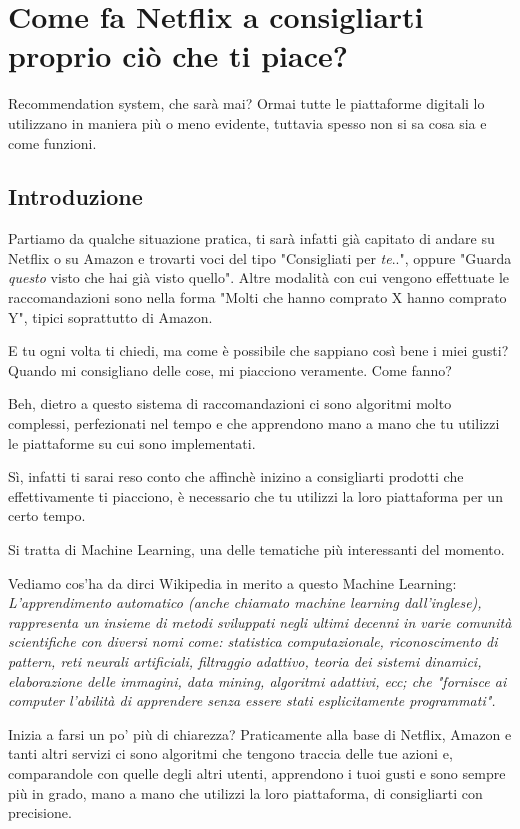 \chapter{Come fa Netflix a consigliarti proprio ciò che ti piace?}
Recommendation system, che sarà mai? Ormai tutte le piattaforme digitali lo utilizzano in maniera più o meno evidente, tuttavia spesso non si sa cosa sia e come funzioni.

\section{Introduzione}

Partiamo da qualche situazione pratica, ti sarà infatti già capitato di andare su Netflix o su Amazon e trovarti voci del tipo "Consigliati per \emph{te}..", oppure "Guarda \emph{questo} visto che hai già visto quello". Altre modalità con cui vengono effettuate le raccomandazioni sono nella forma "Molti che hanno comprato X hanno comprato Y", tipici soprattutto di Amazon.

E tu ogni volta ti chiedi, ma come è possibile che sappiano così bene i miei gusti? Quando mi consigliano delle cose, mi piacciono veramente. Come fanno? 

Beh, dietro a questo sistema di raccomandazioni ci sono algoritmi molto complessi, perfezionati nel tempo e che apprendono mano a mano che tu utilizzi le piattaforme su cui sono implementati.

Sì, infatti ti sarai reso conto che affinchè inizino a consigliarti prodotti che effettivamente ti piacciono, è necessario che tu utilizzi la loro piattaforma per un certo tempo.

Si tratta di Machine Learning, una delle tematiche più interessanti del momento.

Vediamo cos'ha da dirci Wikipedia in merito a questo Machine Learning:
\emph{L’apprendimento automatico (anche chiamato machine learning dall'inglese), rappresenta un insieme di metodi sviluppati negli ultimi decenni in varie comunità scientifiche con diversi nomi come: statistica computazionale, riconoscimento di pattern, reti neurali artificiali, filtraggio adattivo, teoria dei sistemi dinamici, elaborazione delle immagini, data mining, algoritmi adattivi, ecc; che "fornisce ai computer l'abilità di apprendere senza essere stati esplicitamente programmati".}

Inizia a farsi un po' più di chiarezza? Praticamente alla base di Netflix, Amazon e tanti altri servizi ci sono algoritmi che tengono traccia delle tue azioni e, comparandole con quelle degli altri utenti, apprendono i tuoi gusti e sono sempre più in grado, mano a mano che utilizzi la loro piattaforma, di consigliarti con precisione.

